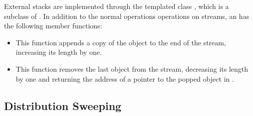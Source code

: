 
External stacks are implemented through the templated class
, 
which is a subclass of . In
addition to the normal operations operations on streams, an
 has the following member functions:
\begin{itemize}
    \item {} This function
    appends a copy of the object  to the end of
    the stream, increasing its length by one.

    \item {} This function
    removes the last object from the stream, decreasing its
    length by one and returning the address of a pointer to
    the popped object in .
\end{itemize}

\subsection{Distribution Sweeping}

\tobewritten

